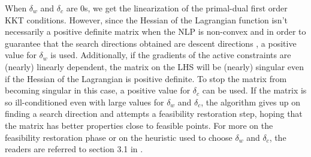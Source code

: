   When $\delta_w$ and $\delta_c$ are 0s, we get the linearization of the primal-dual first order KKT conditions. However, since the Hessian of the Lagrangian function isn't necessarily a positive definite matrix when the NLP is non-convex and in order to guarantee that the search directions obtained are descent directions \citep{Wachter2006}, a positive value for $\delta_w$ is used. Additionally, if the gradients of the active constraints are (nearly) linearly dependent, the matrix on the LHS will be (nearly) singular even if the Hessian of the Lagrangian is positive definite. To stop the matrix from becoming singular in this case, a positive value for $\delta_c$ can be used. If the matrix is so ill-conditioned even with large values for $\delta_w$ and $\delta_c$, the algorithm gives up on finding a search direction and attempts a feasibility restoration step, hoping that the matrix has better properties close to feasible points. For more on the feasibility restoration phase or on the heuristic used to choose $\delta_w$ and $\delta_c$, the readers are referred to section 3.1 in \cite{Wachter2006}.
  
